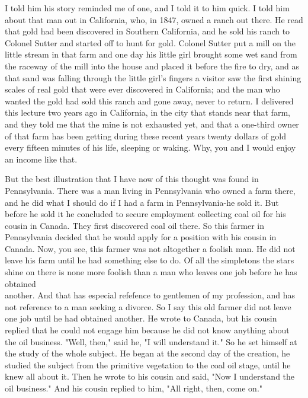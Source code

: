 \documentclass[10pt]{article}
\begin{document}
I told him his story reminded me of one, and I told it to him quick. I told him about that man out in California, who, in 1847, owned a ranch out there. He read that gold had been discovered in Southern California, and he sold his ranch to Colonel Sutter and started off to hunt for gold. Colonel Sutter put a mill on the little stream in that farm and one day his little girl brought some wet sand from the raceway of the mill into the house and placed it before the fire to dry, and as that sand was falling through the little girl's fingers a visitor saw the first shining scales of real gold that were ever discovered in California; and the man who wanted the gold had sold this ranch and gone away, never to return. I delivered this lecture two years ago in California, in the city that stands near that farm, and they told me that the mine is not exhausted yet, and that a one-third owner of that farm has been getting during these recent years twenty dollars of gold every fifteen minutes of his life, sleeping or waking. Why, you and I would enjoy an income like that.

But the best illustration that I have now of this thought was found in Pennsylvania. There was a man living in Pennsylvania who owned a farm there, and he did what I should do if I had a farm in Pennsylvania-he sold it. But before he sold it he concluded to secure employment collecting coal oil for his cousin in Canada. They first discovered coal oil there. So this farmer in Pennsylvania decided that he would apply for a position with his cousin in Canada. Now, you see, this farmer was not altogether a foolish man. He did not leave his farm until he had something else to do. Of all the simpletons the stars shine on there is none more foolish than a man who leaves one job before he has obtained\\
another. And that has especial refefence to gentlemen of my profession, and has not reference to a man seeking a divorce. So I say this old farmer did not leave one job until he had obtained another. He wrote to Canada, but his cousin replied that he could not engage him because he did not know anything about the oil business. "Well, then," said he, "I will understand it." So he set himself at the study of the whole subject. He began at the second day of the creation, he studied the subject from the primitive vegetation to the coal oil stage, until he knew all about it. Then he wrote to his cousin and said, "Now I understand the oil business." And his cousin replied to him, "All right, then, come on."
\end{document}
